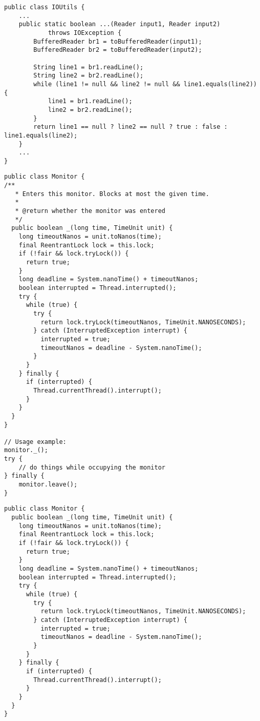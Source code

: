 \begin{code}
\begin{verbatim}
public class IOUtils {
	...
    public static boolean ...(Reader input1, Reader input2)
            throws IOException {
        BufferedReader br1 = toBufferedReader(input1);
        BufferedReader br2 = toBufferedReader(input2);

        String line1 = br1.readLine();
        String line2 = br2.readLine();
        while (line1 != null && line2 != null && line1.equals(line2)) {
            line1 = br1.readLine();
            line2 = br2.readLine();
        }
        return line1 == null ? line2 == null ? true : false : line1.equals(line2);
    }
    ...
}
\end{verbatim}
\caption{Commons IO 2.4 IOUtils.contentEqualsIgnoreEOL Variant 2}
\label{lst:ioutils.contentequalsignoreeol-variant1}
\end{code}

\newpage
\begin{code}
\begin{verbatim}
public class Monitor {
/**
   * Enters this monitor. Blocks at most the given time.
   *
   * @return whether the monitor was entered
   */
  public boolean _(long time, TimeUnit unit) {
    long timeoutNanos = unit.toNanos(time);
    final ReentrantLock lock = this.lock;
    if (!fair && lock.tryLock()) {
      return true;
    }
    long deadline = System.nanoTime() + timeoutNanos;
    boolean interrupted = Thread.interrupted();
    try {
      while (true) {
        try {
          return lock.tryLock(timeoutNanos, TimeUnit.NANOSECONDS);
        } catch (InterruptedException interrupt) {
          interrupted = true;
          timeoutNanos = deadline - System.nanoTime();
        }
      }
    } finally {
      if (interrupted) {
        Thread.currentThread().interrupt();
      }
    }
  }
}

// Usage example:
monitor._();
try {
	// do things while occupying the monitor
} finally {
	monitor.leave();
}
\end{verbatim}
\caption{Guava 17.0 Monitor.enter Variant 1}
\label{lst:guava-monitorenter-variant1}
\end{code}

\newpage
\begin{code}
\begin{verbatim}
public class Monitor {
  public boolean _(long time, TimeUnit unit) {
    long timeoutNanos = unit.toNanos(time);
    final ReentrantLock lock = this.lock;
    if (!fair && lock.tryLock()) {
      return true;
    }
    long deadline = System.nanoTime() + timeoutNanos;
    boolean interrupted = Thread.interrupted();
    try {
      while (true) {
        try {
          return lock.tryLock(timeoutNanos, TimeUnit.NANOSECONDS);
        } catch (InterruptedException interrupt) {
          interrupted = true;
          timeoutNanos = deadline - System.nanoTime();
        }
      }
    } finally {
      if (interrupted) {
        Thread.currentThread().interrupt();
      }
    }
  }
}
\end{verbatim}
\caption{Guava 17.0 Monitor.enter Variant 2}
\label{lst:guava-monitorenter-variant2}
\end{code}